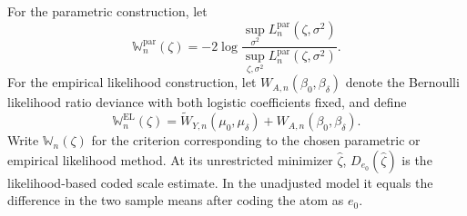 \documentclass[11pt]{article}
\begin{document}
For the parametric construction, let
\[
  \mathbb{W}_n^{\mathrm{par}}(\zeta)
  =
  -2\log
  \frac{\sup_{\sigma^2}L_n^{\mathrm{par}}(\zeta,\sigma^2)}
       {\sup_{\zeta,\sigma^2}L_n^{\mathrm{par}}(\zeta,\sigma^2)}.
\]
For the empirical likelihood construction, let $W_{A,n}(\beta_0,\beta_\delta)$ denote the Bernoulli likelihood ratio deviance with both logistic coefficients fixed, and define
\[
  \mathbb{W}_n^{\mathrm{EL}}(\zeta)
  =
  \widetilde{W}_{Y,n}(\mu_0,\mu_\delta)
  +W_{A,n}(\beta_0,\beta_\delta).
\]
Write $\mathbb{W}_n(\zeta)$ for the criterion corresponding to the chosen parametric or empirical likelihood method. At its unrestricted minimizer $\widehat{\zeta}$, $D_{e_0}(\widehat{\zeta})$ is the likelihood-based coded scale estimate. In the unadjusted model it equals the difference in the two sample means after coding the atom as $e_0$.
\end{document}
